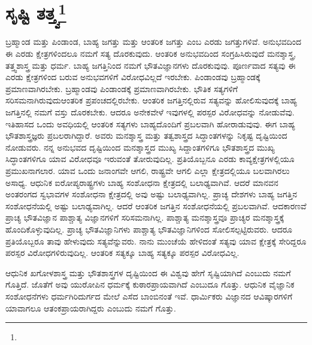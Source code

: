 
\chapter[ಸೃಷ್ಟಿ ತತ್ತ್ವ]{ಸೃಷ್ಟಿ ತತ್ತ್ವ\protect\footnote{}}

ಬ್ರಹ್ಮಾಂಡ ಮತ್ತು ಪಿಂಡಾಂಡ, ಬಾಹ್ಯ ಜಗತ್ತು ಮತ್ತು ಆಂತರಿಕ ಜಗತ್ತು ಎಂಬ ಎರಡು ಜಗತ್ತುಗಳಿವೆ. ಅನುಭವದಿಂದ ಈ ಎರಡು ಕ್ಷೇತ್ರಗಳಿಂದಲೂ ನಮಗೆ ಸತ್ಯ ದೊರಕುವುದು. ಆಂತರಿಕ ಅನುಭವದಿಂದ ಸಂಗ್ರಹಿಸಿರುವುದೆ ಮನಶ್ಶಾಸ್ತ್ರ, ತತ್ತ್ವಶಾಸ್ತ್ರ ಮತ್ತು ಧರ್ಮ. ಬಾಹ್ಯ ಜಗತ್ತಿನಿಂದ ನಮಗೆ ಭೌತವಿಜ್ಞಾನಗಳು ದೊರಕುವುವು. ಪೂರ್ಣವಾದ ಸತ್ಯವು ಈ ಎರಡು ಕ್ಷೇತ್ರಗಳಿಂದ ಬರುವ ಅನುಭವಗಳಿಗೆ ವಿರೋಧವಿಲ್ಲದೆ ಇರಬೇಕು. ಪಿಂಡಾಂಡವು ಬ್ರಹ್ಮಾಂಡಕ್ಕೆ ಪ್ರಮಾಣವಾಗಿರಬೇಕು. ಬ್ರಹ್ಮಾಂಡವು ಪಿಂಡಾಂಡಕ್ಕೆ ಪ್ರಮಾಣವಾಗಿರಬೇಕು. ಭೌತಿಕ ಸತ್ಯಗಳಿಗೆ ಸರಿಸಮನಾಗಿರುವುದು\break ಆಂತರಿಕ ಪ್ರಪಂಚದಲ್ಲಿರಬೇಕು. ಆಂತರಿಕ ಜಗತ್ತಿನಲ್ಲಿರುವ ಸತ್ಯವನ್ನು ಹೋಲಿಸುವುದಕ್ಕೆ ಬಾಹ್ಯ ಜಗತ್ತಿನಲ್ಲಿ ನಮಗೆ ವಸ್ತು ದೊರಕಬೇಕು. ಆದರೂ ಅನೇಕವೇಳೆ ಇವುಗಳಲ್ಲಿ ಪರಸ್ಪರ ವಿರೋಧವನ್ನು ನೋಡುವೆವು. ಇತಿಹಾಸದ ಒಂದು ಅವಧಿಯಲ್ಲಿ ಆಂತರಿಕ ಸತ್ಯಗಳು ಬಾಹ್ಯದೊಂದಿಗೆ ಪ್ರಬಲವಾಗಿ ಹೋರಾಡುವುವು. ಈಗ ಬಾಹ್ಯ ಭೌತಶಾಸ್ತ್ರಜ್ಞರು ಪ್ರಬಲರಾಗಿದ್ದಾರೆ. ಅವರು ಮನಶ್ಶಾಸ್ತ್ರ ಮತ್ತು ತತ್ವಶಾಸ್ತ್ರದ ಸಿದ್ಧಾಂತಗಳನ್ನು ನಿಕೃಷ್ಟ ದೃಷ್ಟಿಯಿಂದ ನೋಡುವರು. ನನ್ನ ಅನುಭವದ ದೃಷ್ಟಿಯಿಂದ ಮನಶ್ಶಾಸ್ತ್ರದ ಮುಖ್ಯ ಸಿದ್ದಾಂತಗಳಿಗೂ ಭೌತಶಾಸ್ತ್ರದ ಮುಖ್ಯ ಸಿದ್ಧಾಂತಗಳಿಗೂ ಯಾವ ವಿರೋಧವೂ ಇರುವಂತೆ ತೋರುವುದಿಲ್ಲ. ಪ್ರತಿಯೊಬ್ಬನೂ ಎರಡು ಕಾವ್ಯಕ್ಷೇತ್ರಗಳಲ್ಲಿಯೂ ಪ್ರಮುಖನಾಗಲಾರ. ಯಾವ ಒಂದು ಜನಾಂಗವೇ ಆಗಲಿ, ರಾಷ್ಟ್ರವೇ ಆಗಲಿ ಎಲ್ಲಾ ಕ್ಷೇತ್ರದಲ್ಲಿಯೂ ಬಲವಾಗಿರಲು ಅಸಾಧ್ಯ. ಆಧುನಿಕ ಐರೋಪ್ಯರಾಷ್ಟ್ರಗಳು ಬಾಹ್ಯ ಸಂಶೋಧನಾ ಕ್ಷೇತ್ರದಲ್ಲಿ ಬಲಾಢ್ಯವಾಗಿವೆ. ಆದರೆ ಮಾನವನ ಅಂತರಂಗದ ಸ್ವಭಾವಗಳ ಸಂಶೋಧನಾ ಕ್ಷೇತ್ರದಲ್ಲಿ ಅವು ಅಷ್ಟು ಬಲಾಢ್ಯವಾಗಿಲ್ಲ. ಪ್ರಾಚ್ಯ ದೇಶಗಳು ಬಾಹ್ಯ ಜಗತ್ತಿನ ಸಂಶೋಧನೆಯಲ್ಲಿ ಅಷ್ಟು ಬಲಾಢ್ಯವಾಗಿಲ್ಲ. ಆದರೆ ಆಂತರಿಕ ಜಗತ್ತಿನ ಸಂಶೋಧನೆಯಲ್ಲಿ ಪ್ರಬಲವಾಗಿವೆ. ಆದಕಾರಣವೆ ಪ್ರಾಚ್ಯ ಭೌತವಿಜ್ಞಾನ ಪಾಶ್ಚಾತ್ಯ ವಿಜ್ಞಾನಗಳಿಗೆ ಸರಿಸಮನಾಗಿಲ್ಲ. ಪಾಶ್ಚಾತ್ಯ ಮನಶ್ಶಾಸ್ತ್ರವೂ ಪ್ರಾಚ್ಯರ ಮನಶ್ಶಾಸ್ತ್ರಕ್ಕೆ ಹೊಂದಿಕೊಳ್ಳುವುದಿಲ್ಲ. ಪ್ರಾಚ್ಯ ಭೌತವಿಜ್ಞಾನಿಗಳು ಪಾಶ್ಚಾತ್ಯ ಭೌತವಿಜ್ಞಾನಿಗಳಿಂದ ಸೋಲಿಸಲ್ಪಟ್ಟಿರುವರು. ಆದರೂ ಪ್ರತಿಯೊಬ್ಬರೂ ತಾವು ಹೇಳುವುದು ಸತ್ಯವೆನ್ನುವರು. ನಾನು ಮುಂಚೆಯೆ ಹೇಳಿದಂತೆ ಸತ್ಯವು ಯಾವ ಕ್ಷೇತ್ರಕ್ಕೆ ಸೇರಿದ್ದರೂ ಪರಸ್ಪರ ವಿರೋಧಗಳಿರುವುದಿಲ್ಲ. ಆಂತರಿಕ ಸತ್ಯಕ್ಕೂ ಬಾಹ್ಯ ಸತ್ಯಕ್ಕೂ ಪರಸ್ಪರ ವಿರೋಧವಿಲ್ಲ.

ಆಧುನಿಕ ಖಗೋಳಶಾಸ್ತ್ರ ಮತ್ತು ಭೌತಶಾಸ್ತ್ರಗಳ ದೃಷ್ಟಿಯಿಂದ ಈ ವಿಶ್ವವು ಹೇಗೆ ಸೃಷ್ಟಿಯಾಗಿದೆ ಎಂಬುದು ನಮಗೆ ಗೊತ್ತಿದೆ. ಜೊತೆಗೆ ಅವು ಯುರೋಪಿನ ಧರ್ಮಕ್ಕೆ ಕುಠಾರಪ್ರಾಯವಾಗಿದೆ ಎಂಬುದೂ ಗೊತ್ತು. ಆಧುನಿಕ ವೈಜ್ಞಾನಿಕ ಸಂಶೋಧನೆಗಳು ಧರ್ಮಗಿರಿದುರ್ಗದ ಮೇಲೆ ಎಸೆದ ಬಾಂಬಿನಂತೆ ಇವೆ. ಧಾರ್ಮಿಕರು ವಿಜ್ಞಾನದ ಆವಿಷ್ಕಾರಗಳಿಗೆ ಯಾವಾಗಲೂ ಆತಂಕಪ್ರಾಯರಾಗಿದ್ದರು ಎಂಬುದು ನಮಗೆ ಗೊತ್ತು.

